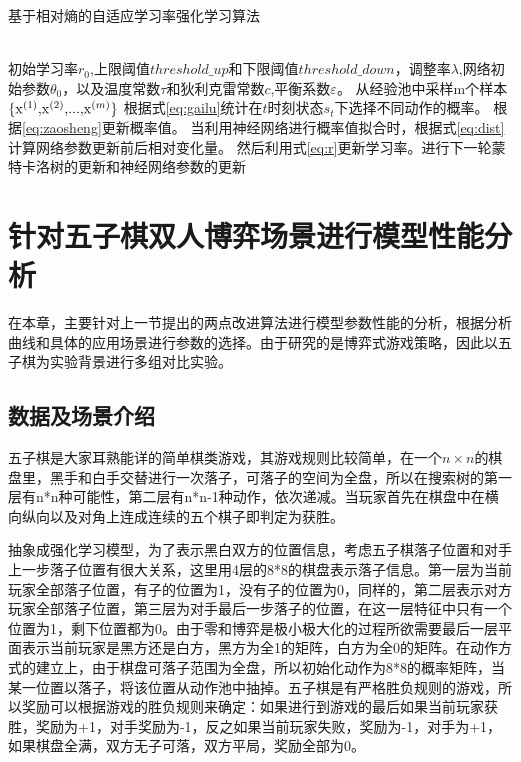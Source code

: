 \begin{algorithm}[!htpb]
	\caption{基于相对熵的自适应学习率强化学习算法}%
	\begin{algorithmic}[1]
		\Require ~~ \\
		初始学习率$r_0$,上限阈值$threshold\_up$和下限阈值$threshold\_down$，调整率$\lambda$,网络初始参数$\theta_0$，以及温度常数$\tau$和狄利克雷常数$c$,平衡系数$\varepsilon $。
		\State 从经验池中采样m个样本${\rm{\{ }}{{\rm{x}}^{(1)}}{\rm{,}}{{\rm{x}}^{(2)}}{\rm{,}}...{\rm{,}}{{\rm{x}}^{(m)}}{\rm{\} }}$
		\State 根据式\ref{eq:gailu}统计在$t$时刻状态$s_t$下选择不同动作的概率。
		\State 根据\ref{eq:zaosheng}更新概率值。
		\State 当利用神经网络进行概率值拟合时，根据式\ref{eq:dist}计算网络参数更新前后相对变化量。
		\State 然后利用式\ref{eq:r}更新学习率。进行下一轮蒙特卡洛树的更新和神经网络参数的更新
		\EndWhile
	\end{algorithmic}
\end{algorithm}
\section{针对五子棋双人博弈场景进行模型性能分析}
在本章，主要针对上一节提出的两点改进算法进行模型参数性能的分析，根据分析曲线和具体的应用场景进行参数的选择。由于研究的是博弈式游戏策略，因此以五子棋为实验背景进行多组对比实验。

\subsection{数据及场景介绍}
五子棋是大家耳熟能详的简单棋类游戏，其游戏规则比较简单，在一个$n \times n$的棋盘里，黑手和白手交替进行一次落子，可落子的空间为全盘，所以在搜索树的第一层有n*n种可能性，第二层有n*n-1种动作，依次递减。当玩家首先在棋盘中在横向纵向以及对角上连成连续的五个棋子即判定为获胜。

抽象成强化学习模型，为了表示黑白双方的位置信息，考虑五子棋落子位置和对手上一步落子位置有很大关系，这里用4层的8*8的棋盘表示落子信息。第一层为当前玩家全部落子位置，有子的位置为1，没有子的位置为0，同样的，第二层表示对方玩家全部落子位置，第三层为对手最后一步落子的位置，在这一层特征中只有一个位置为1，剩下位置都为0。由于零和博弈是极小极大化的过程所欲需要最后一层平面表示当前玩家是黑方还是白方，黑方为全1的矩阵，白方为全0的矩阵。在动作方式的建立上，由于棋盘可落子范围为全盘，所以初始化动作为8*8的概率矩阵，当某一位置以落子，将该位置从动作池中抽掉。五子棋是有严格胜负规则的游戏，所以奖励可以根据游戏的胜负规则来确定：如果进行到游戏的最后如果当前玩家获胜，奖励为+1，对手奖励为-1，反之如果当前玩家失败，奖励为-1，对手为+1，如果棋盘全满，双方无子可落，双方平局，奖励全部为0。

